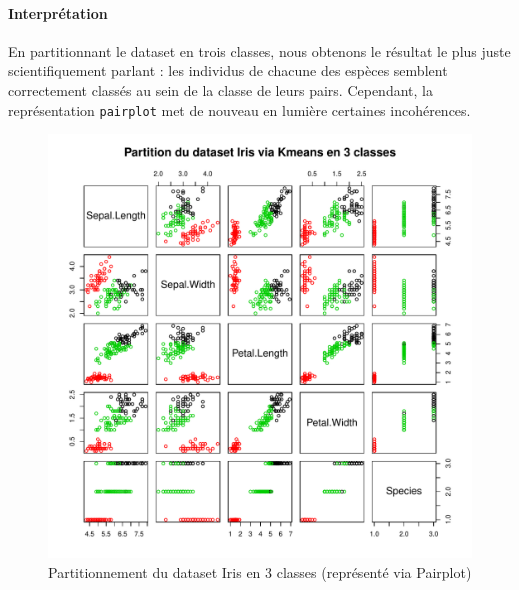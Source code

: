 \documentclass{report}
\begin{document}
\paragraph{Interprétation}
En partitionnant le dataset en trois classes, nous obtenons le résultat le plus juste scientifiquement parlant : les individus de chacune des espèces semblent correctement classés au sein de la classe de leurs pairs. Cependant, la représentation \verb+pairplot+ met de nouveau en lumière certaines incohérences.
\begin{figure}[ht!]
\begin{center}
    \includegraphics[width=\textwidth]{../plots/E3Q1_ki3_2.pdf}
    \caption{Partitionnement du dataset Iris en 3 classes (représenté via Pairplot)}
\end{center}
\end{figure}
\newpage
\end{document}

